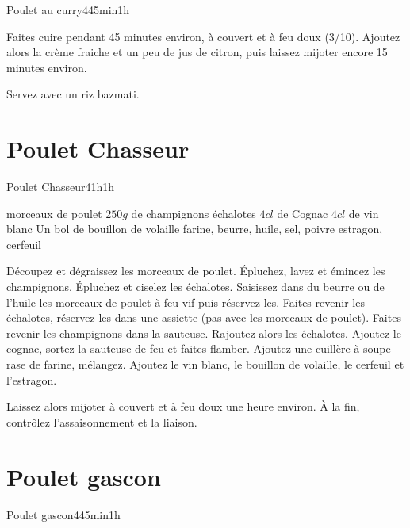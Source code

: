 {\begin{recette}{Poulet au curry}{4}{45min}{1h}
\begin{cuisson}
Faites cuire pendant 45 minutes environ, à couvert et à feu doux (3/10). Ajoutez alors la crème fraiche et un peu de jus 
de citron, puis laissez mijoter encore 15 minutes environ. 

Servez avec un riz bazmati.
\end{cuisson}
\end{recette}


\section{Poulet Chasseur}
\begin{recette}{Poulet Chasseur}{4}{1h}{1h}
\begin{ingredients}
 morceaux de poulet
\ingredient $250\unit{g}$ de champignons
 échalotes
\ingredient $4\unit{cl}$ de Cognac
\ingredient $4\unit{cl}$ de vin blanc
\ingredient Un bol de bouillon de volaille
\ingredient farine, beurre, huile, sel, poivre
\ingredient estragon, cerfeuil
\end{ingredients}


\begin{preparation}
\etape Découpez et dégraissez les morceaux de poulet. 
\etape Épluchez, lavez et émincez les champignons. Épluchez et ciselez les échalotes.
\etape Saisissez dans du beurre ou de l'huile les morceaux de poulet à feu vif puis réservez-les.
\etape Faites revenir les échalotes, réservez-les dans une assiette (pas avec les morceaux de poulet).
\etape Faites revenir les champignons dans la sauteuse. 
\etape Rajoutez alors les échalotes. Ajoutez le cognac, sortez la sauteuse de feu et faites flamber. 
\etape Ajoutez une cuillère à soupe rase de farine, mélangez.
\etape Ajoutez le vin blanc, le bouillon de volaille, le cerfeuil et l'estragon. 
\end{preparation}

\begin{cuisson}
Laissez alors mijoter à couvert et à feu doux une heure environ. À la fin, contrôlez l'assaisonnement et la liaison.
\end{cuisson}
\end{recette}

\section{Poulet gascon}
\begin{recette}{Poulet gascon}{4}{45min}{1h}


\end{recette}}
